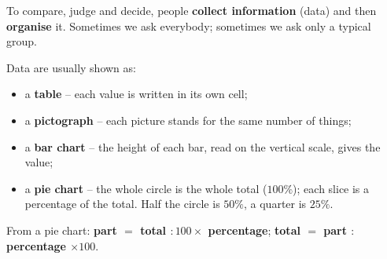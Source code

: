 \newcommand{\stpBars}[6]{%
\begin{tikzpicture}[font=\footnotesize,y=#1cm,x=1cm,>=stealth]
\foreach \n/\v/\d [count=\i] in {#4}{\xdef\stpN{\i}}
\pgfmathsetmacro\stpW{\stpN*1.2+0.1}
\foreach \t in {0,#3,...,#2}{\draw[Line] (0,\t)--(\stpW,\t); \node[left,text=Slate] at (0,\t){$\t$};}
\foreach \n/\v/\d [count=\i] in {#4}{
  \pgfmathsetmacro\stpC{\i*1.2-0.5}
  \fill[tmBlue!65] (\stpC-0.3,0) rectangle (\stpC+0.3,\v);
  \node[above,font=\footnotesize\bfseries,text=Ink] at (\stpC,\v){$\d$};
  \node[below,text=Ink] at (\stpC,0){\n};}
\draw[->,line width=0.8pt] (0,0)--([yshift=0.55cm]0,#2);
\draw[->,line width=0.8pt] (0,0)--(\stpW+0.35,0);
\node[above,text=Slate] at ([yshift=0.55cm]0,#2){#5};
\node[right,text=Slate] at (\stpW+0.35,0){#6};
\end{tikzpicture}}
\newcommand{\stpPie}[2][1.5]{%
\begin{tikzpicture}[font=\footnotesize]
\def\stpA{90}
\foreach \v/\t/\c/\n [count=\i] in {#2}{
  \pgfmathsetmacro\stpB{\stpA-3.6*\v}
  \pgfmathsetmacro\stpM{(\stpA+\stpB)/2}
  \pgfmathsetmacro\stpR{0.64*#1}
  \fill[\c] (0,0) -- (\stpA:#1) arc[start angle=\stpA,end angle=\stpB,radius=#1] -- cycle;
  \draw[white,line width=1.2pt] (0,0) -- (\stpA:#1);
  \node[text=Ink,font=\footnotesize\bfseries] at (\stpM:\stpR) {\t};
  \fill[\c] (#1+0.7,#1-0.55*\i+0.1) rectangle ++(0.32,0.32);
  \node[anchor=west,text=Ink,font=\small] at (#1+1.1,#1-0.55*\i+0.26) {\n};
  \global\let\stpA\stpB}
\draw[Slate,line width=0.8pt] (0,0) circle (#1);
\end{tikzpicture}}
\newcommand{\stpIcons}[1]{\foreach \k in {1,...,#1}{\textcolor{tmBlue}{\faBook}\ }}
\begin{knowbox}
To compare, judge and decide, people \textbf{collect information} (data) and then \textbf{organise} it. Sometimes we ask everybody; sometimes we ask only a typical group.\par\smallskip
Data are usually shown as:
\begin{itemize}[leftmargin=1.4em,itemsep=3pt]
\item a \textbf{table} -- each value is written in its own cell;
\item a \textbf{pictograph} -- each picture stands for the same number of things;
\item a \textbf{bar chart} -- the height of each bar, read on the vertical scale, gives the value;
\item a \textbf{pie chart} -- the whole circle is the whole total ($100\%$); each slice is a percentage of the total. Half the circle is $50\%$, a quarter is $25\%$.
\end{itemize}
From a pie chart: \quad \textbf{part $=$ total $:100\times$ percentage}; \quad \textbf{total $=$ part $:$ percentage $\times100$}.
\end{knowbox}
